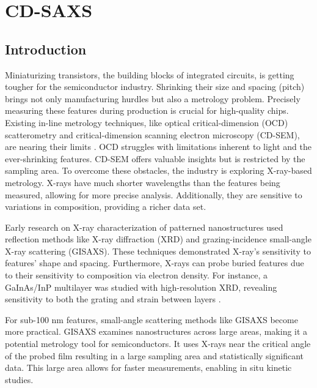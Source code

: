 \section{CD-SAXS}
\subsection{Introduction}

\medskip

Miniaturizing transistors, the building blocks of integrated circuits, is getting
tougher for the semiconductor industry. Shrinking their size and spacing (pitch)
brings not only manufacturing hurdles but also a metrology problem. Precisely
measuring these features during production is crucial for high-quality chips.
Existing in-line metrology techniques, like optical critical-dimension (OCD)
scatterometry and critical-dimension scanning electron microscopy (CD-SEM), are
nearing their limits \cite{SEM_resolution,OCD_resolution}. OCD struggles with limitations inherent to light and the
ever-shrinking features. CD-SEM offers valuable insights but is restricted by
the sampling area. To overcome these obstacles, the industry is exploring X-ray-based metrology.
X-rays have much shorter wavelengths than the features being measured, allowing
for more precise analysis. Additionally, they are sensitive to variations in
composition, providing a richer data set.

\medskip

Early research on X-ray characterization of patterned nanostructures used reflection
methods like X-ray diffraction (XRD) and grazing-incidence small-angle X-ray scattering (GISAXS). 
These techniques demonstrated X-ray's sensitivity to features' shape and spacing.
Furthermore, X-rays can probe buried features due to their sensitivity to composition via electron density. For instance, a GaInAs/InP multilayer was studied with high-resolution XRD, revealing 
sensitivity to both the grating and strain between layers \cite{Baumbach_Lübbert_Gailhanou_2000}.

\medskip

For sub-100 nm features, small-angle scattering methods like GISAXS become more practical. 
GISAXS examines nanostructures across large areas, making it a potential metrology tool 
for semiconductors. It uses X-rays near the critical angle of the probed film
resulting in a large sampling area and statistically significant data. This large area allows for faster measurements, enabling in situ kinetic studies.

